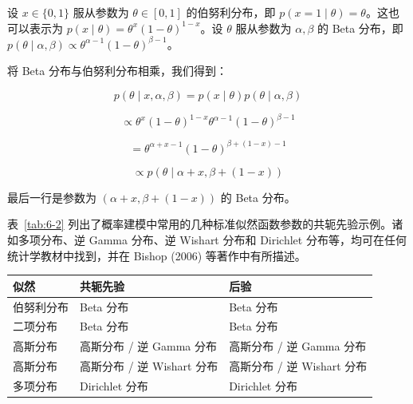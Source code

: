 \begin{notebox}
设 $ x \in \{0, 1\} $ 服从参数为 $ \theta \in [0, 1] $ 的伯努利分布，即 $ p(x = 1 \mid \theta) = \theta $。这也可以表示为 $ p(x \mid \theta) = \theta^x (1 - \theta)^{1-x} $。设 $ \theta $ 服从参数为 $ \alpha, \beta $ 的 Beta 分布，即 $ p(\theta \mid \alpha, \beta) \propto \theta^{\alpha-1} (1 - \theta)^{\beta-1} $。
\end{notebox}

\begin{notebox}
将 Beta 分布与伯努利分布相乘，我们得到：

\begin{equation}
p(\theta \mid x, \alpha, \beta) = p(x \mid \theta) p(\theta \mid \alpha, \beta)
\tag{6.105a}\label{eq:6-105a}
\end{equation}

\begin{equation}
\propto \theta^x (1 - \theta)^{1-x} \theta^{\alpha-1} (1 - \theta)^{\beta-1}
\tag{6.105b}\label{eq:6-105b}
\end{equation}

\begin{equation}
= \theta^{\alpha+x-1} (1 - \theta)^{\beta+(1-x)-1}
\tag{6.105c}\label{eq:6-105c}
\end{equation}

\begin{equation}
\propto p(\theta \mid \alpha + x, \beta + (1 - x))
\tag{6.105d}\label{eq:6-105d}
\end{equation}

最后一行是参数为 $ (\alpha + x, \beta + (1 - x)) $ 的 Beta 分布。
\end{notebox}

表~\ref{tab:6-2} 列出了概率建模中常用的几种标准似然函数参数的共轭先验示例。诸如多项分布、逆 Gamma 分布、逆 Wishart 分布和 Dirichlet 分布等，均可在任何统计学教材中找到，并在 Bishop (2006) 等著作中有所描述。

\begin{longtable}{>{\raggedright\arraybackslash}p{\dimexpr(\textwidth-36pt)/3\relax} >{\raggedright\arraybackslash}p{\dimexpr(\textwidth-36pt)/3\relax} >{\raggedright\arraybackslash}p{\dimexpr(\textwidth-36pt)/3\relax}}
\hline
\textbf{似然} & \textbf{共轭先验} & \textbf{后验} \\ \hline
\endhead
伯努利分布 & Beta 分布 & Beta 分布 \\ \hline
二项分布 & Beta 分布 & Beta 分布 \\ \hline
高斯分布 & 高斯分布 / 逆 Gamma 分布 & 高斯分布 / 逆 Gamma 分布 \\ \hline
高斯分布 & 高斯分布 / 逆 Wishart 分布 & 高斯分布 / 逆 Wishart 分布 \\ \hline
多项分布 & Dirichlet 分布 & Dirichlet 分布 \\ \hline
\end{longtable}

